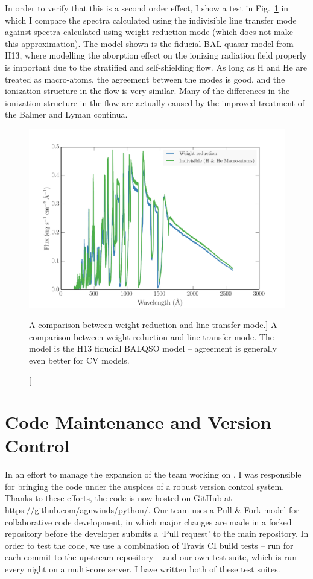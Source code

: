 In order to verify that this is a second order effect, 
I show a test in Fig.~\ref{fig:line_transfer} in which I compare the spectra calculated
using the indivisible 
line transfer mode against spectra calculated
using weight reduction mode (which does not make this 
approximation). The model shown is the fiducial BAL quasar model from
H13, where modelling the aborption effect on the ionizing radiation field 
properly is important due to the stratified
and self-shielding flow. As long as H and He are treated as macro-atoms, the agreement
between the modes is good, and the ionization structure in the flow is very similar.
Many of the differences in the ionization structure in the flow are actually
caused by the improved treatment of the Balmer and Lyman continua.

\begin{figure}
\centering
\includegraphics[width=1.0\textwidth]{figures/03-radtrans/line_transfer_comparison.png}
\caption
[A comparison between weight reduction and line transfer mode.]
{
A comparison between weight reduction and line transfer mode. 
The model is the H13 fiducial BALQSO model -- agreement is generally even
better for CV models. 
} 
\label{fig:line_transfer}
\end{figure}

\section{Code Maintenance and Version Control}
\label{sec:code_maintenance}

In an effort to manage the expansion of the team working on \py, I was responsible
for bringing the code under the auspices of a robust version control system.
Thanks to these efforts, the code is now hosted on GitHub at 
\url{https://github.com/agnwinds/python/}. Our team uses a Pull \& Fork model
for collaborative code development, in which major changes are made in a 
forked repository before the developer submits a `Pull request' to the main 
repository. In order to test the code, we use a combination of Travis CI build tests 
-- run for each commit to the upstream repository -- and our own test suite, which is 
run every night on a multi-core server. I have written both of these test suites.

